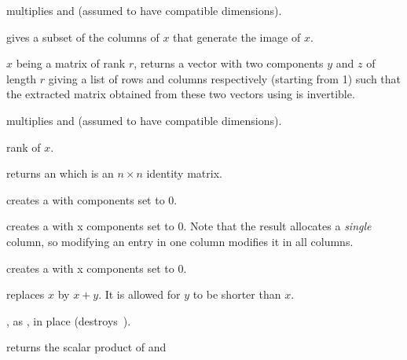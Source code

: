  multiplies   and  (assumed
to have compatible dimensions).

 gives a subset of the columns of $x$ that generate
the image of $x$.


 $x$ being a matrix of rank $r$, returns a
vector with two  components $y$ and $z$ of length $r$ giving a
list of rows and columns respectively (starting from 1) such that the extracted
matrix obtained from these two vectors using is invertible.

 multiplies   and  (assumed to
have compatible dimensions).

 rank of $x$.

 returns an  which is an $n \times n$
identity matrix.

 creates a  with  components set to
$0$.

 creates a  with  x 
components set to $0$. Note that the result allocates a
\emph{single} column, so modifying an entry in one column modifies it in
all columns.

 creates a  with  x
 components set to $0$.









 replaces $x$ by $x+y$. It is
allowed for $y$ to be shorter than $x$.


, as , in place (destroys~).


 returns the scalar product of 
and 

